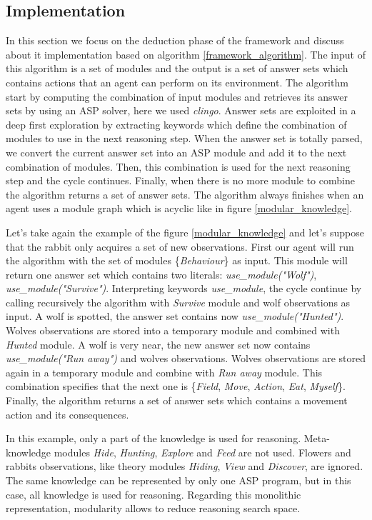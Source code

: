 \documentclass{aamas2012}
\begin{document}
\subsection{Implementation}

	In this section we focus on the deduction phase of the framework and discuss about it implementation based on algorithm \ref{framework_algorithm}.
	The input of this algorithm is a set of modules and the output is a set of answer sets which contains actions that an agent can perform on its environment.
	The algorithm start by computing the combination of input modules and retrieves its answer sets by using an ASP solver, here we used \emph{clingo}.
	Answer sets are exploited in a deep first exploration by extracting keywords which define the combination of modules to use in the next reasoning step.
	When the answer set is totally parsed, we convert the current answer set into an ASP module and add it to the next combination of modules.
	Then, this combination is used for the next reasoning step and the cycle continues.
	Finally, when there is no more module to combine the algorithm returns a set of answer sets.
	The algorithm always finishes when an agent uses a module graph which is acyclic like in figure \ref{modular_knowledge}.

	Let's take again the example of the figure \ref{modular_knowledge} and let's suppose that the rabbit only acquires a set of new observations.
	First our agent will run the algorithm with the set of modules \{\emph{Behaviour}\} as input.
	This module will return one answer set which contains two literals: \emph{use\_module("Wolf")}, \emph{use\_module("Survive")}.
	Interpreting keywords \emph{use\_module}, the cycle continue by calling recursively the algorithm with \emph{Survive} module and wolf observations as input.
	A wolf is spotted, the answer set contains now \emph{use\_module("Hunted")}.
	Wolves observations are stored into a temporary module and combined with \emph{Hunted} module.
	A wolf is very near, the new answer set now contains \emph{use\_module("Run away")} and wolves observations.
	Wolves observations are stored again in a temporary module and combine with \emph{Run away} module.
	This combination specifies that the next one is \{\emph{Field}, \emph{Move}, \emph{Action}, \emph{Eat}, \emph{Myself}\}.
	Finally, the algorithm returns a set of answer sets which contains a movement action and its consequences.
	
	In this example, only a part of the knowledge is used for reasoning.
	Meta-knowledge modules \emph{Hide}, \emph{Hunting}, \emph{Explore} and \emph{Feed} are not used.
	Flowers and rabbits observations, like theory modules \emph{Hiding}, \emph{View} and \emph{Discover}, are ignored.
	The same knowledge can be represented by only one ASP program, but in this case, all knowledge is used for reasoning.
	Regarding this monolithic representation, modularity allows to reduce reasoning search space.
\end{document}
